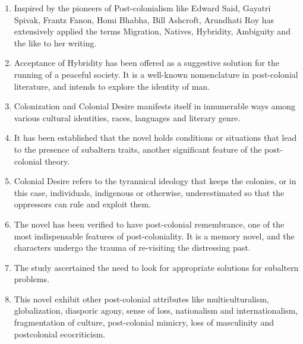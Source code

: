 \begin{enumerate}
  \item Inspired by the pioneers of Post-colonialism like Edward Said, Gayatri Spivak, Frantz Fanon, Homi Bhabha, Bill Ashcroft, Arundhati Roy has extensively applied the terms Migration, Natives, Hybridity, Ambiguity and the like to her writing. 

  \item Acceptance of Hybridity has been offered as a suggestive solution for the running of a peaceful society. It is a well-known nomenclature in post-colonial literature, and intends to explore the identity of man.

  \item Colonization and Colonial Desire manifests itself in innumerable ways among various cultural identities, races, languages and literary genre.

  \item It has been established that the novel holds conditions or situations that lead to the presence of subaltern traits, another significant feature of the post-colonial theory.

  \item Colonial Desire refers to the tyrannical ideology that keeps the colonies, or in this case, individuals, indigenous or otherwise, underestimated so that the oppressors can rule and exploit them. 

  \item The novel has been verified to have post-colonial remembrance, one of the most indispensable features of post-coloniality.  It is a memory novel, and the characters undergo the trauma of re-visiting the distressing past.

  \item The study ascertained the need to look for appropriate solutions for subaltern problems.

  \item This novel exhibit other post-colonial attributes like multiculturalism, globalization, diasporic agony, sense of loss, nationalism and internationalism,  fragmentation of culture, post-colonial mimicry, loss of masculinity and postcolonial ecocriticism.
\end{enumerate}